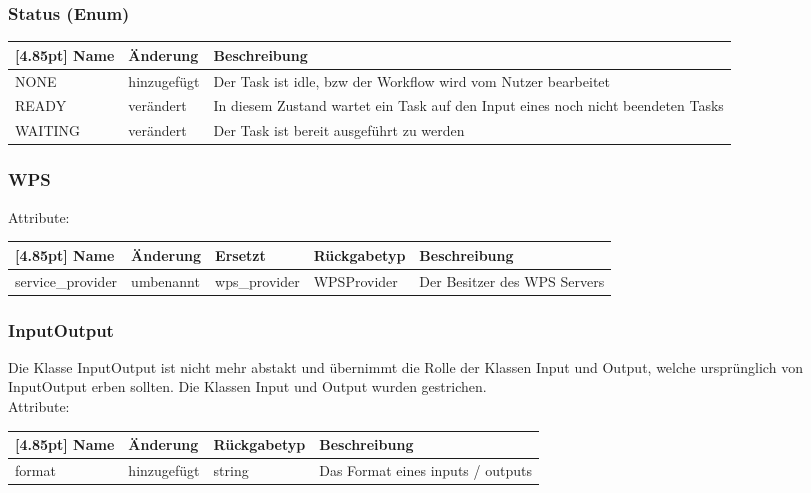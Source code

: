 		\subsubsection{Status (Enum)}	
			\begin{center}
				\renewcommand{\arraystretch}{1.5}
				\setlength\tabcolsep{5pt}
				\begin{tabularx}{\textwidth}{|l|l|X|}
					\hline
					\rowcolor[gray]{0.75}[4.85pt]
					Name & Änderung & Beschreibung \\ \hline
					NONE & hinzugefügt & Der Task ist idle, bzw der Workflow wird vom Nutzer bearbeitet \\ \hline
					READY & verändert & In diesem Zustand wartet ein Task auf den Input eines noch nicht beendeten Tasks  \\ \hline
					WAITING & verändert & Der Task ist bereit ausgeführt zu werden \\ \hline
				\end{tabularx}
			\end{center}

		\subsubsection{WPS}
			
			Attribute:
			\begin{center}
				\setlength\tabcolsep{5pt}
				\renewcommand{\arraystretch}{1.5}
				
				\begin{tabularx}{\textwidth}{|l|l|l|l|X|}
					\hline
					\rowcolor[gray]{0.75}[4.85pt]
					Name & Änderung & Ersetzt & Rückgabetyp & Beschreibung \\ \hline 
					service\_provider & umbenannt & wps\_provider & WPSProvider & Der Besitzer des WPS Servers \\ \hline
					
				\end{tabularx}
			\end{center}

		\subsubsection{InputOutput} 
		Die Klasse InputOutput ist nicht mehr abstakt und übernimmt die Rolle der Klassen Input und Output, welche ursprünglich von InputOutput erben sollten. Die Klassen Input und Output wurden gestrichen. \\
			Attribute:
			\begin{center}
				\setlength\tabcolsep{5pt}
				\renewcommand{\arraystretch}{1.5}
				
				\begin{tabularx}{\textwidth}{|l|l|l|X|}
					\hline
					\rowcolor[gray]{0.75}[4.85pt]
					Name & Änderung & Rückgabetyp & Beschreibung \\ \hline 
					format & hinzugefügt & string & Das Format eines inputs / outputs \\ \hline
				\end{tabularx}
			\end{center}
			
